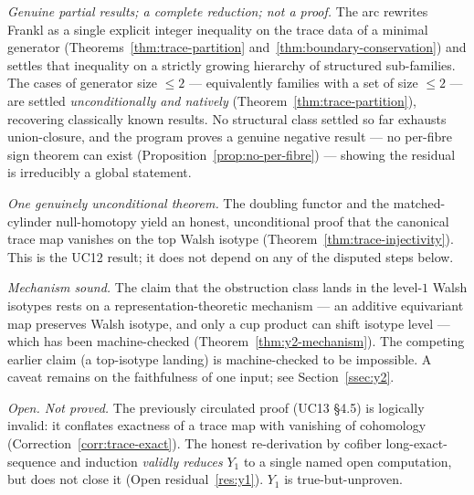 \begin{description}[leftmargin=1.4em,style=nextline]

\item[The combinatorial arc (UC1--UC8), Section~\ref{sec:combinatorial}.]
\emph{Genuine partial results; a complete reduction; not a proof.} The
arc rewrites Frankl as a single explicit integer inequality on the
trace data of a minimal generator (Theorems~\ref{thm:trace-partition}
and~\ref{thm:boundary-conservation}) and settles that
inequality on a strictly growing hierarchy of structured
sub-families. The cases of generator size $\le2$ --- equivalently
families with a set of size $\le2$ --- are settled
\emph{unconditionally and natively} (Theorem~\ref{thm:trace-partition}),
recovering classically known results. No structural class settled so
far exhausts union-closure, and the program proves a genuine negative
result --- no per-fibre sign theorem can exist
(Proposition~\ref{prop:no-per-fibre}) --- showing the residual is
irreducibly a global statement.

\item[The cohomological arc, trace-injectivity, Section~\ref{sec:cohomology}.]
\emph{One genuinely unconditional theorem.} The doubling functor and
the matched-cylinder null-homotopy yield an honest, unconditional
proof that the canonical trace map vanishes on the top Walsh isotype
(Theorem~\ref{thm:trace-injectivity}). This is the UC12 result; it does
not depend on any of the disputed steps below.

\item[$Y_2$ --- the obstruction-class landing, Section~\ref{ssec:y2}.]
\emph{Mechanism sound.} The claim that the obstruction class lands in
the level-$1$ Walsh isotypes rests on a representation-theoretic
mechanism --- an additive equivariant map preserves Walsh isotype, and
only a cup product can shift isotype level --- which has been
machine-checked (Theorem~\ref{thm:y2-mechanism}). The competing earlier
claim (a top-isotype landing) is machine-checked to be impossible. A
caveat remains on the faithfulness of one input; see
Section~\ref{ssec:y2}.

\item[$Y_1$ --- the level-$1$ Walsh vanishing, Section~\ref{ssec:y1}.]
\emph{Open. Not proved.} The previously circulated proof
(UC13 \S4.5) is logically invalid: it conflates exactness of a trace
map with vanishing of cohomology (Correction~\ref{corr:trace-exact}).
The honest re-derivation by cofiber long-exact-sequence and induction
\emph{validly reduces} $Y_1$ to a single named open computation, but
does not close it (Open residual~\ref{res:y1}). $Y_1$ is
true-but-unproven.


\end{description}
